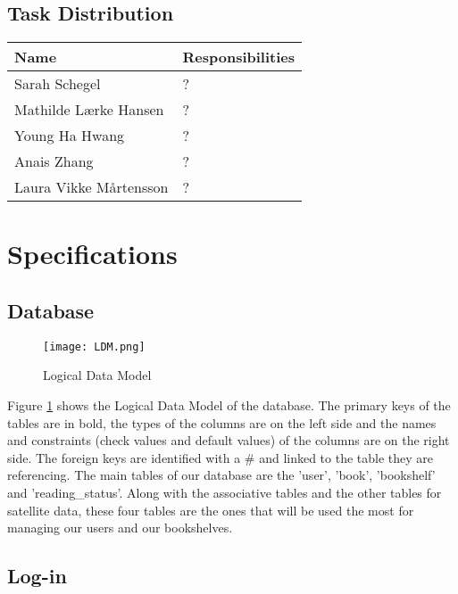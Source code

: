\documentclass[conference]{IEEEtran}
\begin{document}
\subsection{Task Distribution}
\hfill


\begin{center}
\begin{tabular}{ | m{3.5cm} | m{4.1cm}| } 

\hline
Name & Responsibilities \\
 \hline
 Sarah Schegel  & ? \\
 \hline
 Mathilde Lærke Hansen & ? \\
 \hline
 Young Ha Hwang & ? \\
 \hline
 Anais Zhang & ? \\
 \hline
 Laura Vikke Mårtensson & ? \\
 \hline
 
\end{tabular}
\end{center}

\section{Specifications}

\subsection{Database}

\begin{figure}[h]
    \centering
    \texttt{[image: LDM.png]}
    \caption{Logical Data Model\cite{LDM}}
    \label{fig:ldm}
\end{figure}

Figure \ref{fig:ldm} shows the Logical Data Model of the database. The primary keys of the tables are in bold, the types of the columns are on the left side and the names and constraints (check values and default values) of the columns are on the right side. The foreign keys are identified with a \# and linked to the table they are referencing.
The main tables of our database are the 'user', 'book', 'bookshelf' and 'reading\_status'. Along with the associative tables and the other tables for satellite data, these four tables are the ones that will be used the most for managing our users and our bookshelves.

\subsection{Log-in}
\end{document}
